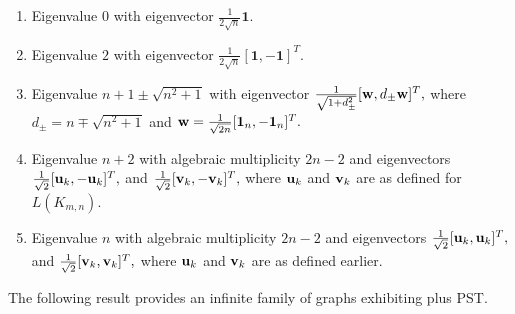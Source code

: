 \documentclass[12pt,a4paper]{article}
\def \u {{\bf u}}
\def \v {{\bf v}}
\def \w {{\bf w}}
\begin{document}
\begin{enumerate}[label=(\roman*)]
    \item Eigenvalue $0$ with eigenvector $\frac{1}{2\sqrt{n}}\mathbf{1}.$
    \item Eigenvalue $2$ with eigenvector $\frac{1}{2\sqrt{n}}[\mathbf{1},
        -\mathbf{1}]^T.$
    \item Eigenvalue $n+1\pm\sqrt{n^2+1}$ with eigenvector $\frac{1}{\sqrt{1+d_{\pm}^2}}[
            \w,
       d_{\pm}\w]^T,$ where $d_{\pm}=n\mp\sqrt{n^2+1}$ and $\w=\frac{1}{\sqrt{2n}}[
            \mathbf{1}_n,-\mathbf{1}_n]^T.$
        \item Eigenvalue $n+2$ with algebraic multiplicity $2n-2$ and eigenvectors $\frac{1}{\sqrt{2}}
           [\u_k,
        -\u_k]^T,$ and $\frac{1}{\sqrt{2}}
           [\v_k,
        -\v_k]^T,$ where $\u_k$ and $\v_k$ are as defined for $L(K_{m,n}).$
        \item Eigenvalue $n$ with algebraic multiplicity $2n-2$ and eigenvectors $\frac{1}{\sqrt{2}}[\u_k,
        \u_k]^T,$ and $\frac{1}{\sqrt{2}}[
           \v_k,
        \v_k]^T,$ where $\u_k$ and $\v_k$ are as defined earlier.
\end{enumerate}
The following result provides an infinite family of graphs exhibiting plus PST.
\end{document}
